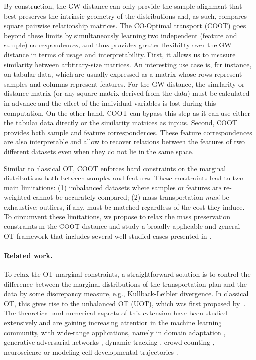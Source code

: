 By construction, the GW distance can only provide the sample alignment that best preserves the intrinsic geometry of the distributions and, as such, compares square pairwise relationship matrices. The CO-Optimal transport (COOT) \citep{Redko20,Chowdhury21b} goes beyond these limits by simultaneously learning two independent (feature and sample) correspondences, and thus provides greater flexibility over the GW distance in terms of usage and interpretability. First, it allows us to measure similarity between arbitrary-size matrices. An interesting use case is, for instance, on tabular data, which are usually expressed as a matrix whose rows represent samples and columns represent features. For the GW distance,
the similarity or distance matrix (or any square matrix derived from the data)
must be calculated in advance and the effect of the individual variables is lost during this computation. On the other hand, COOT can bypass this step as it can use either the tabular data directly or the similarity matrices as inputs. Second, COOT provides both sample and feature correspondences. These feature correspondences are also interpretable and allow to recover relations between the features of two different datasets even when they do not lie in the same space.

Similar to classical OT, COOT enforces hard constraints on the marginal distributions
both between samples and features. These constraints lead to two main limitations:
(1) imbalanced datasets where samples or features are re-weighted
cannot be accurately compared; (2) mass transportation \emph{must} be exhaustive:
outliers, if any, must be matched regardless of the cost they induce.
To circumvent these limitations, we propose to relax the mass preservation constraints
in the COOT distance and study a broadly applicable and general OT framework
that includes several well-studied cases presented in .

\paragraph{Related work.}
To relax the OT marginal constraints, a straightforward solution is to control
the difference between the marginal distributions of the transportation plan
and the data by some discrepancy measure, e.g., Kullback-Leibler divergence.
In classical OT, this gives rise to the unbalanced OT (UOT),
which was first proposed by~\citep{Benamou03}.
The theoretical and numerical aspects of this extension
have been studied extensively \citep{Liero18,Chizat18b,Chizat18a,Khiem20}
and are gaining increasing attention in the machine
learning community, with wide-range applications, namely in
domain adaptation \citep{Fatras21}, generative adversarial networks
\citep{Balaji20, Yang19}, dynamic tracking \citep{Lee19}, crowd counting \citep{Ma21},
neuroscience \citep{janati2019group, bazeille2019} or
modeling cell developmental trajectories \citep{Schiebinger19}.

